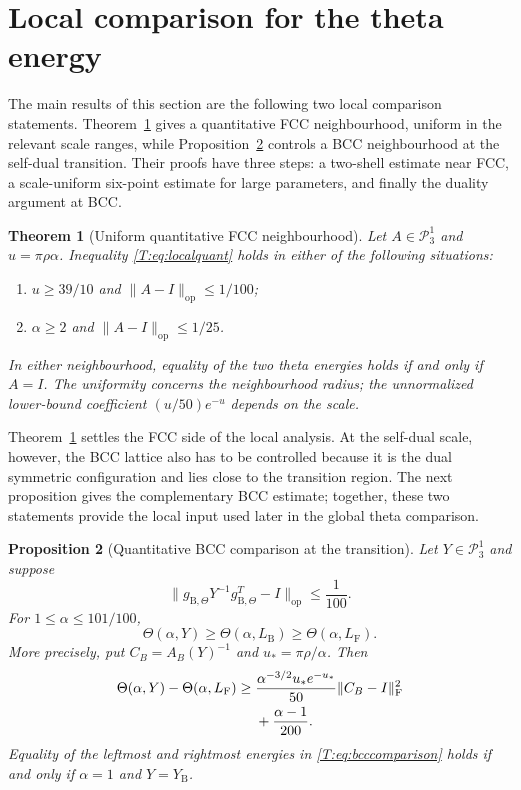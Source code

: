 \documentclass[reqno,english]{amsart}
\newtheorem{theorem}{Theorem}[section]
\newtheorem{proposition}[theorem]{Proposition}
\theoremstyle{definition}
\newtheorem{open problem}[theorem]{Open Problem}
\theoremstyle{remark}
\theoremstyle{plain}
\numberwithin{equation}{section}
\newcommand{\FCC}{L_{\mathrm F}}
\newcommand{\B}{L_{\mathrm B}}
\newcommand{\BCC}{\B}
\newcommand{\YB}{Y_{\mathrm B}}
\newcommand{\PP}{\mathcal P_3^1}
\newcommand{\calP}{\PP}
\newcommand{\op}{\mathrm{op}}
\newcommand{\frob}{\mathrm F}
\newcommand{\Th}{\Theta}
\newcommand{\Id}{I}
\newcommand{\gBT}{g_{\mathrm B,\Theta}}
\begin{document}
\section{Local comparison for the theta energy}\label{sec:theta-local}\label{T:sec:local}

The main results of this section are the following two local comparison statements. Theorem~\ref{T:thm:local} gives a quantitative FCC neighbourhood, uniform in the relevant scale ranges, while Proposition~\ref{T:prop:bcclocal} controls a BCC neighbourhood at the self-dual transition. Their proofs have three steps: a two-shell estimate near FCC, a scale-uniform six-point estimate for large parameters, and finally the duality argument at BCC.

\begin{theorem}[Uniform quantitative FCC neighbourhood]\label{T:thm:local}
Let $A\in\calP$ and $u=\pi\rho\alpha$. Inequality \eqref{T:eq:localquant} holds in either of the following situations:
\begin{enumerate}[label=(\roman*),leftmargin=2em]
\item $u\ge39/10$ and $\|A-\Id\|_{\op}\le1/100$;
\item $\alpha\ge2$ and $\|A-\Id\|_{\op}\le1/25$.
\end{enumerate}
In either neighbourhood, equality of the two theta energies holds if and
only if $A=\Id$. The uniformity concerns the neighbourhood radius; the
unnormalized lower-bound coefficient $(u/50)e^{-u}$ depends on the scale.
\end{theorem}

Theorem~\ref{T:thm:local} settles the FCC side of the local analysis. At the self-dual scale, however, the BCC lattice also has to be controlled because it is the dual symmetric configuration and lies close to the transition region. The next proposition gives the complementary BCC estimate; together, these two statements provide the local input used later in the global theta comparison.

\begin{proposition}[Quantitative BCC comparison at the transition]\label{T:prop:bcclocal}
Let $Y\in\calP$ and suppose
\begin{equation}\label{T:eq:bccball}
 \|\gBT Y^{-1}\gBT^T-\Id\|_{\op}\le\frac1{100}.
\end{equation}
For $1\le\alpha\le101/100$,
\begin{equation}\label{T:eq:bcccomparison}
 \Th(\alpha,Y)\ge\Th(\alpha,\BCC)\ge\Th(\alpha,\FCC).
\end{equation}
More precisely, put $C_B=A_B(Y)^{-1}$ and $u_* = \pi\rho/\alpha$. Then
\begin{align}\label{T:eq:bcc-quantitative}
 \Th(\alpha,Y)-\Th(\alpha,\FCC)
 \ge{}&\frac{\alpha^{-3/2}u_*e^{-u_*}}{50}
          \|C_B-I\|_{\frob}^2\notag\\
      &+\frac{\alpha-1}{200}.
\end{align}
Equality of the leftmost and rightmost energies in
\eqref{T:eq:bcccomparison} holds if and only if $\alpha=1$ and $Y=\YB$.
\end{proposition}
\end{document}
